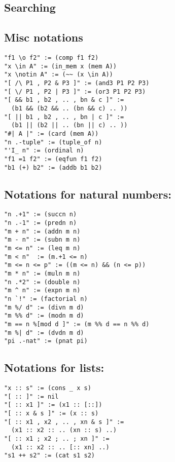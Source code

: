 \begin{landscape}
\begin{small}
\begin{multicols*}{3}[\begin{center}\section*{}\end{center}]
\subsection*{Searching}


\subsection*{Misc notations}
\begin{lstlisting}
"f1 \o f2" := (comp f1 f2)
"x \in A" := (in_mem x (mem A))
"x \notin A" := (~~ (x \in A))
"[ /\ P1 , P2 & P3 ]" := (and3 P1 P2 P3)
"[ \/ P1 , P2 | P3 ]" := (or3 P1 P2 P3)
"[ && b1 , b2 , .. , bn & c ]" :=
  (b1 && (b2 && .. (bn && c) .. ))
"[ || b1 , b2 , .. , bn | c ]" :=
  (b1 || (b2 || .. (bn || c) .. ))
"#| A |" := (card (mem A))
"n .-tuple" := (tuple_of n)
"'I_ n" := (ordinal n)
"f1 =1 f2" := (eqfun f1 f2)
"b1 (+) b2" := (addb b1 b2)
\end{lstlisting}

\subsection*{Notations for natural numbers: }
\begin{lstlisting}
"n .+1" := (succn n)
"n .-1" := (predn n)
"m + n" := (addn m n)
"m - n" := (subn m n)
"m <= n" := (leq m n)
"m < n"  := (m.+1 <= n)
"m <= n <= p" := ((m <= n) && (n <= p))
"m * n" := (muln m n)
"n .*2" := (double n)
"m ^ n" := (expn m n)
"n `!" := (factorial n)
"m %/ d" := (divn m d)
"m %% d" := (modn m d)
"m == n %[mod d ]" := (m %% d == n %% d)
"m %| d" := (dvdn m d)
"pi .-nat" := (pnat pi)
\end{lstlisting}

\subsection*{Notations for lists: }
\begin{lstlisting}
"x :: s" := (cons _ x s)
"[ :: ]" := nil
"[ :: x1 ]" := (x1 :: [::])
"[ :: x & s ]" := (x :: s)
"[ :: x1 , x2 , .. , xn & s ]" :=
  (x1 :: x2 :: .. (xn :: s) ..)
"[ :: x1 ; x2 ; .. ; xn ]" :=
  (x1 :: x2 :: .. [:: xn] ..)
"s1 ++ s2" := (cat s1 s2)
\end{lstlisting}



\end{multicols*}
\end{small}
\end{landscape}
